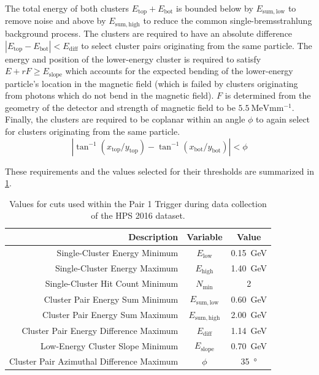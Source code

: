 The total energy of both clusters $E_\mathrm{top}+E_\mathrm{bot}$ is bounded below
by $E_\mathrm{sum,low}$ to remove noise and above by $E_\mathrm{sum,high}$ to reduce
the common single-bremsstrahlung background process.
The clusters are required to have an absolute difference $|E_\mathrm{top}-E_\mathrm{bot}| < E_\mathrm{diff}$
to select cluster pairs originating from the same particle.
The energy and position of the lower-energy cluster is required to satisfy
$E + r F \geq E_\mathrm{slope}$ which accounts for the expected bending of
the lower-energy particle's location in the magnetic field (which is failed
by clusters originating from photons which do not bend in the magnetic field).
$F$ is determined from the geometry of the detector and strength of magnetic
field to be $\qty{5.5}{\MeV\mm^{-1}}$.
Finally, the clusters are required to be coplanar within an angle $\phi$ to
again select for clusters originating from the same particle.
$$
  |\tan^{-1}(x_\mathrm{top}/y_\mathrm{top}) - \tan^{-1}(x_\mathrm{bot}/y_\mathrm{bot})| < \phi
$$

These requirements and the values selected for their thresholds are summarized
in \cref{tab:pair-1-trigger}.

\begin{table}[h]
  \centering
  \begin{tabular}{|r|c|c|}
    \hline
    Description & Variable & Value \\ \hline
    Single-Cluster Energy Minimum & $E_\mathrm{low}$ & \qty{0.15}{\GeV} \\
    Single-Cluster Energy Maximum & $E_\mathrm{high}$ & \qty{1.40}{\GeV} \\
    Single-Cluster Hit Count Minimum & $N_\mathrm{min}$ & 2 \\
    \hline
    Cluster Pair Energy Sum Minimum & $E_\mathrm{sum,low}$ & \qty{0.60}{\GeV} \\
    Cluster Pair Energy Sum Maximum & $E_\mathrm{sum,high}$ & \qty{2.00}{\GeV} \\
    Cluster Pair Energy Difference Maximum & $E_\mathrm{diff}$ & \qty{1.14}{\GeV} \\
    Low-Energy Cluster Slope Minimum & $E_\mathrm{slope}$ & \qty{0.70}{\GeV} \\
    Cluster Pair Azimuthal Difference Maximum & $\phi$ & \qty{35}{\degree} \\
    \hline
  \end{tabular}
  \caption{Values for cuts used within the Pair 1 Trigger during data collection of the HPS 2016 dataset.}
  \label{tab:pair-1-trigger}
\end{table}


